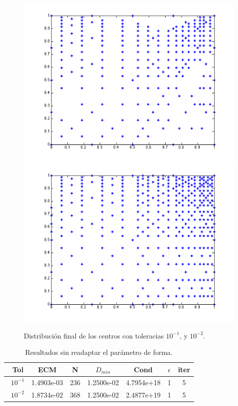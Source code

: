 \documentclass[11pt,a4paper]{article}
\begin{document}
\begin{figure}[H]
\begin{center}
\includegraphics[scale=.4]{edp3_tol1_2.png}
\includegraphics[scale=.4]{edp3_tol2_2.png}
\caption{Distribución final de los  centros  con toleracias $10^{-1}$, y $10^{-2}$.}
\end{center}
\end{figure}


\begin{table}[H]
\caption{Resultados sin readaptar el parámetro de forma.}
\begin{center}
\begin{tabular}{|c|c|c|c|c|c|c|}
\hline
\ Tol & ECM & N & $D_{min}$ & Cond & $\epsilon$ & iter \\
\hline
\ $10^{-1}$ & 1.4903e-03& 236& 1.2500e-02& 4.7954e+18& 1& 5\\
\ $10^{-2}$ & 1.8734e-02& 368& 1.2500e-02&2.4877e+19& 1&5\\
\hline
\end{tabular}
\end{center}
\end{table}
\end{document}
